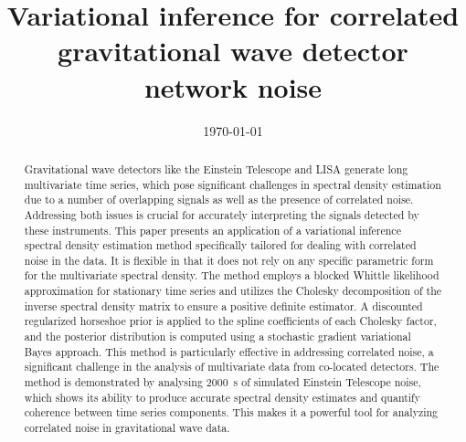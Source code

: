 \documentclass[%
 reprint,
 amsmath,amssymb,
 aps,
 nofootinbib,
]{revtex4-2}
\begin{document}



\title{Variational inference for correlated\\ gravitational wave detector network noise
}


\date{\today}%

\begin{abstract}
Gravitational wave detectors like the Einstein Telescope and LISA generate long multivariate time series, which pose significant challenges in spectral density estimation due to a number of overlapping signals as well as the presence of correlated noise.
Addressing both issues is crucial for accurately interpreting the signals detected by these instruments.
This paper presents an application of a variational inference spectral density estimation method specifically tailored for dealing with correlated noise in the data. It is flexible in that it does not rely on any specific parametric form for the multivariate spectral density.
The method employs a blocked Whittle likelihood approximation for stationary time series and utilizes the Cholesky decomposition of the inverse spectral density matrix to ensure a positive definite estimator. 
A discounted regularized horseshoe prior is applied to the spline coefficients of each Cholesky factor, and the posterior distribution is computed using a stochastic gradient variational Bayes approach. 
This method is particularly effective in addressing correlated noise, a significant challenge in the analysis of multivariate data from co-located detectors. 
The method is demonstrated by analysing \SI{2000}{\second} of simulated Einstein Telescope noise, which shows its ability to produce accurate spectral density estimates and quantify coherence between time series components. This makes it a powerful tool for analyzing correlated noise in gravitational wave data.
\end{abstract}
\end{document}
